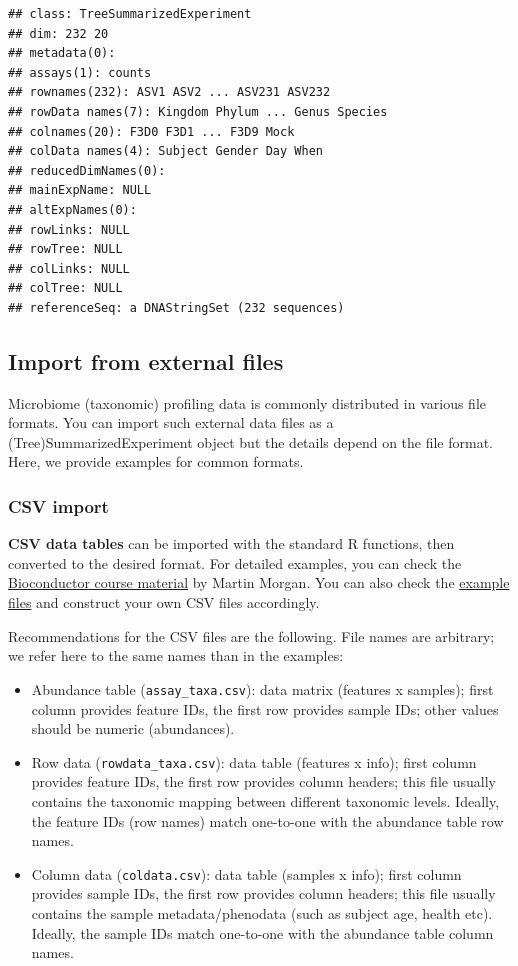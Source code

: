 \documentclass[
]{book}
\begin{document}
\begin{verbatim}
## class: TreeSummarizedExperiment 
## dim: 232 20 
## metadata(0):
## assays(1): counts
## rownames(232): ASV1 ASV2 ... ASV231 ASV232
## rowData names(7): Kingdom Phylum ... Genus Species
## colnames(20): F3D0 F3D1 ... F3D9 Mock
## colData names(4): Subject Gender Day When
## reducedDimNames(0):
## mainExpName: NULL
## altExpNames(0):
## rowLinks: NULL
## rowTree: NULL
## colLinks: NULL
## colTree: NULL
## referenceSeq: a DNAStringSet (232 sequences)
\end{verbatim}

\hypertarget{import-from-external-files}{%
\subsection{Import from external files}\label{import-from-external-files}}

Microbiome (taxonomic) profiling data is commonly distributed in
various file formats. You can import such external data files as a
(Tree)SummarizedExperiment object but the details depend on the file
format. Here, we provide examples for common formats.

\hypertarget{csv-import}{%
\subsubsection{CSV import}\label{csv-import}}

\textbf{CSV data tables} can be imported with the standard R functions,
then converted to the desired format. For detailed examples, you can
check the \href{https://bioconductor.org/help/course-materials/2019/BSS2019/04_Practical_CoreApproachesInBioconductor.html}{Bioconductor course
material}
by Martin Morgan. You can also check the \href{https://github.com/microbiome/OMA/tree/master/data}{example
files} and
construct your own CSV files accordingly.

Recommendations for the CSV files are the following. File names are
arbitrary; we refer here to the same names than in the examples:

\begin{itemize}
\item
  Abundance table (\texttt{assay\_taxa.csv}): data matrix (features x
  samples); first column provides feature IDs, the first row provides
  sample IDs; other values should be numeric (abundances).
\item
  Row data (\texttt{rowdata\_taxa.csv}): data table (features x info); first
  column provides feature IDs, the first row provides column headers;
  this file usually contains the taxonomic mapping between different
  taxonomic levels. Ideally, the feature IDs (row names) match one-to-one with
  the abundance table row names.
\item
  Column data (\texttt{coldata.csv}): data table (samples x info); first
  column provides sample IDs, the first row provides column headers;
  this file usually contains the sample metadata/phenodata (such as
  subject age, health etc). Ideally, the sample IDs match one-to-one with
  the abundance table column names.
\end{itemize}
\end{document}
